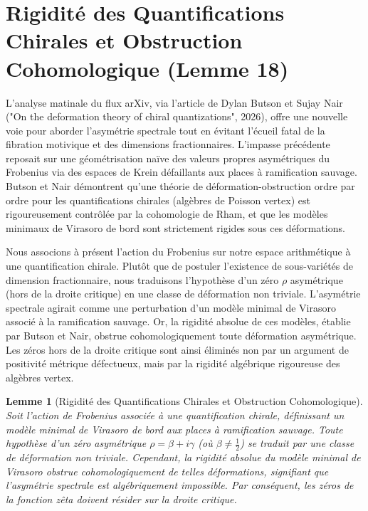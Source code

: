 \documentclass[
]{article}
\newtheorem{lemma}{Lemme}
\begin{document}
\section{Rigidité des Quantifications Chirales et Obstruction Cohomologique (Lemme 18)}

L'analyse matinale du flux arXiv, via l'article de Dylan Butson et Sujay Nair ("On the deformation theory of chiral quantizations", 2026), offre une nouvelle voie pour aborder l'asymétrie spectrale tout en évitant l'écueil fatal de la fibration motivique et des dimensions fractionnaires. L'impasse précédente reposait sur une géométrisation naïve des valeurs propres asymétriques du Frobenius via des espaces de Krein défaillants aux places à ramification sauvage. Butson et Nair démontrent qu'une théorie de déformation-obstruction ordre par ordre pour les quantifications chirales (algèbres de Poisson vertex) est rigoureusement contrôlée par la cohomologie de Rham, et que les modèles minimaux de Virasoro de bord sont strictement rigides sous ces déformations.

Nous associons à présent l'action du Frobenius sur notre espace arithmétique à une quantification chirale. Plutôt que de postuler l'existence de sous-variétés de dimension fractionnaire, nous traduisons l'hypothèse d'un zéro $\rho$ asymétrique (hors de la droite critique) en une classe de déformation non triviale. L'asymétrie spectrale agirait comme une perturbation d'un modèle minimal de Virasoro associé à la ramification sauvage. Or, la rigidité absolue de ces modèles, établie par Butson et Nair, obstrue cohomologiquement toute déformation asymétrique. Les zéros hors de la droite critique sont ainsi éliminés non par un argument de positivité métrique défectueux, mais par la rigidité algébrique rigoureuse des algèbres vertex.

\begin{lemma}[Rigidité des Quantifications Chirales et Obstruction Cohomologique]
Soit l'action de Frobenius associée à une quantification chirale, définissant un modèle minimal de Virasoro de bord aux places à ramification sauvage. Toute hypothèse d'un zéro asymétrique $\rho = \beta + i\gamma$ (où $\beta \neq \frac{1}{2}$) se traduit par une classe de déformation non triviale. Cependant, la rigidité absolue du modèle minimal de Virasoro obstrue cohomologiquement de telles déformations, signifiant que l'asymétrie spectrale est algébriquement impossible. Par conséquent, les zéros de la fonction zêta doivent résider sur la droite critique.
\end{lemma}
\end{document}
